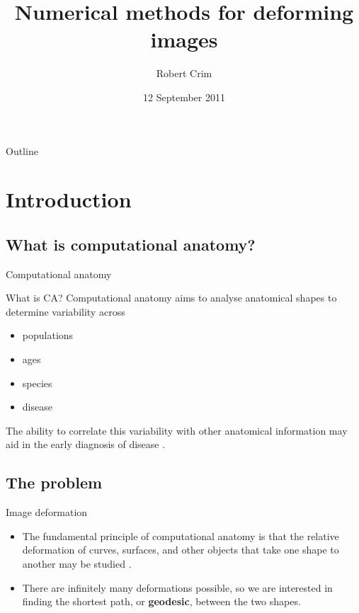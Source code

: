 \documentclass{beamer}
\title{Numerical methods for deforming images}
\author[R. Crim]{Robert Crim}
\date[12/9/11]{12 September 2011}
\institute{Imperial College London}
\begin{document}
\begin{frame}
  \titlepage
\end{frame}

\begin{frame}{Outline}
  \tableofcontents %
\end{frame}

\section{Introduction}
\subsection{What is computational anatomy?}
\begin{frame}{Computational anatomy}
\begin{block}{What is CA?}
Computational anatomy aims to analyse anatomical shapes \cite{miller2001group, miller2009emerging}  to
determine variability across 
\begin{itemize}
\item populations
\item ages
\item species
\item disease
\end{itemize}
\end{block}

The ability to correlate this variability with other anatomical information may aid in the
early diagnosis of disease \cite{mfca11}.
\end{frame}

\subsection{The problem}
\begin{frame}{Image deformation}
\begin{itemize}
\item The fundamental principle of computational anatomy is that the relative deformation of curves, surfaces, and other objects that take one shape to another may be studied \cite{beg2005computing}.
\vspace{5mm}
\pause
\item There are infinitely many deformations possible, so we are interested in finding the shortest path, or \textbf{geodesic}, between the two shapes.
\end{itemize}
\end{frame}
\end{document}
